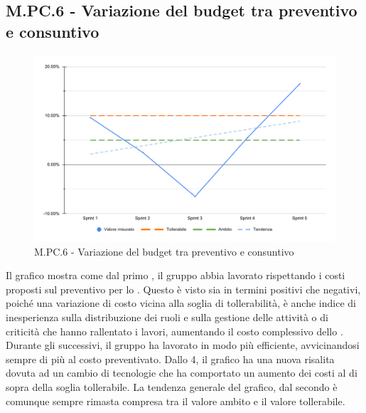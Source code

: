 \subsection{M.PC.6 - Variazione del budget tra preventivo e consuntivo}
\begin{figure}[H]
    \centering
    \includegraphics[width=\textwidth]{assets/variazione_budget.pdf}
    \caption{M.PC.6 - Variazione del budget tra preventivo e consuntivo}
\end{figure}

\par Il grafico mostra come dal primo , il gruppo abbia lavorato rispettando i costi proposti sul preventivo per lo . Questo è visto sia in termini positivi che negativi, poiché una variazione di costo vicina alla soglia di tollerabilità, è anche indice di inesperienza sulla distribuzione dei ruoli e sulla gestione delle attività o di criticità che hanno rallentato i lavori, aumentando il costo complessivo dello .
Durante gli  successivi, il gruppo ha lavorato in modo più efficiente, avvicinandosi sempre di più al costo preventivato. Dallo  4, il grafico ha una nuova risalita dovuta ad un cambio di tecnologie che ha comportato un aumento dei costi al di sopra della soglia tollerabile. La tendenza generale del grafico, dal secondo  è comunque sempre rimasta compresa tra il valore ambito e il valore tollerabile. 